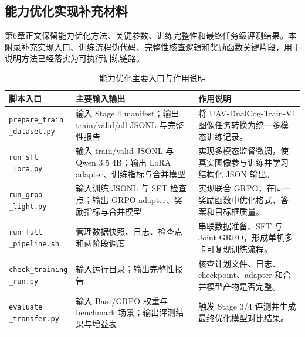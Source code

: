 \begin{thesisappendix}
\section{能力优化实现补充材料}
\label{app:optimization-entry}

第6章正文保留能力优化方法、关键参数、训练完整性和最终任务级评测结果。本附录补充实现入口、训练流程伪代码、完整性核查逻辑和奖励函数关键片段，用于说明方法已经落实为可执行训练链路。

\begin{table}[htbp]
    \centering
    \caption{能力优化主要入口与作用说明}
    \label{tab:app-optimization-entry}
    \scriptsize
    \begin{tabularx}{\textwidth}{@{}p{2.6cm}p{4.1cm}X@{}}
        \toprule
        脚本入口 & 主要输入输出 & 作用说明 \\
        \midrule
        \makecell[l]{\texttt{prepare\_train}\\\texttt{\_dataset.py}} & 输入 Stage 4 manifest；输出 train/valid/all JSONL 与完整性报告 & 将 UAV-DualCog-Train-V1 图像任务转换为统一多模态训练记录。 \\
        \makecell[l]{\texttt{run\_sft}\\\texttt{\_lora.py}} & 输入 train/valid JSONL 与 Qwen 3.5 4B；输出 LoRA adapter、训练指标与合并模型 & 实现多模态监督微调，使真实图像参与训练并学习结构化 JSON 输出。 \\
        \makecell[l]{\texttt{run\_grpo}\\\texttt{\_light.py}} & 输入训练 JSONL 与 SFT 检查点；输出 GRPO adapter、奖励指标与合并模型 & 实现联合 GRPO，在同一奖励函数中优化格式、答案和目标框质量。 \\
        \makecell[l]{\texttt{run\_full}\\\texttt{\_pipeline.sh}} & 管理数据快照、日志、检查点和两阶段调度 & 串联数据准备、SFT 与 Joint GRPO，形成单机多卡可复现训练流程。 \\
        \makecell[l]{\texttt{check\_training}\\\texttt{\_run.py}} & 输入运行目录；输出完整性报告 & 核查计划文件、日志、checkpoint、adapter 和合并模型产物是否完整。 \\
        \makecell[l]{\texttt{evaluate}\\\texttt{\_transfer.py}} & 输入 Base/GRPO 权重与 benchmark 场景；输出评测结果与增益表 & 触发 Stage 3/4 评测并生成最终优化模型对比结果。 \\
        \bottomrule
    \end{tabularx}
\end{table}


\end{thesisappendix}
